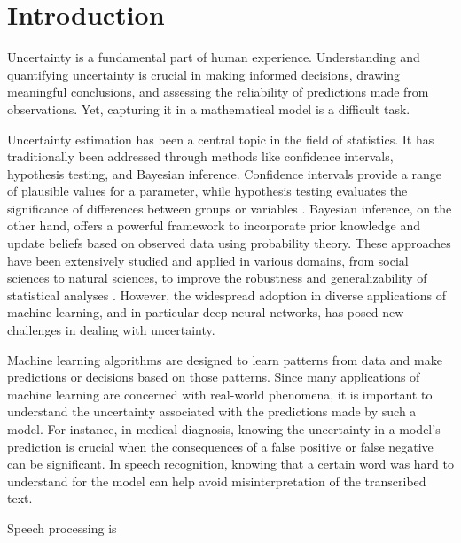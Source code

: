 
\chapter[introduction]{Introduction}\label{chp:introduction}


Uncertainty is a fundamental part of human experience. Understanding and quantifying uncertainty is crucial in making informed decisions, drawing meaningful conclusions, and assessing the reliability of predictions made from observations. Yet, capturing it in a mathematical model is a difficult task. 

Uncertainty estimation has been a central topic in the field of statistics. It has traditionally been addressed through methods like confidence intervals, hypothesis testing, and Bayesian inference. Confidence intervals provide a range of plausible values for a parameter, while hypothesis testing evaluates the significance of differences between groups or variables \cite{blitzstein_introduction_2019}. Bayesian inference, on the other hand, offers a powerful framework to incorporate prior knowledge and update beliefs based on observed data using probability theory. These approaches have been extensively studied and applied in various domains, from social sciences to natural sciences, to improve the robustness and generalizability of statistical analyses \cite{gelman_bayesian_2013}. However, the widespread adoption in diverse applications of machine learning, and in particular deep neural networks, has posed new challenges in dealing with uncertainty. 

Machine learning algorithms are designed to learn patterns from data and make predictions or decisions based on those patterns. Since many applications of machine learning are concerned with real-world phenomena, it is important to understand the uncertainty associated with the predictions made by such a model. For instance, in medical diagnosis, knowing the uncertainty in a model's prediction is crucial when the consequences of a false positive or false negative can be significant. In speech recognition, knowing that a certain word was hard to understand for the model can help avoid misinterpretation of the transcribed text.

Speech processing is 


